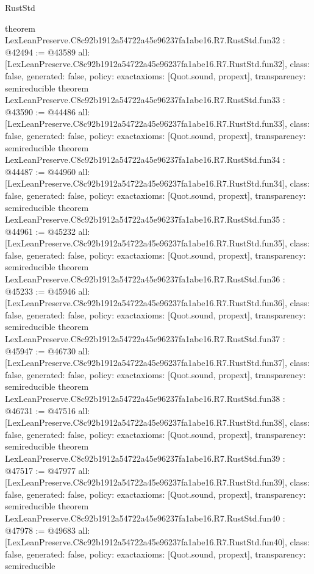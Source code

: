 \begin{lexlean}{RustStd}
\begin{coremodule}
{}
theorem LexLeanPreserve.C8c92b1912a54722a45e96237fa1abe16.R7.RustStd.fun32 : @42494 := @43589 {
  all: [LexLeanPreserve.C8c92b1912a54722a45e96237fa1abe16.R7.RustStd.fun32],
  class: false,
  generated: false,
  policy: exact{axioms: [Quot.sound, propext]},
  transparency: semireducible
}
theorem LexLeanPreserve.C8c92b1912a54722a45e96237fa1abe16.R7.RustStd.fun33 : @43590 := @44486 {
  all: [LexLeanPreserve.C8c92b1912a54722a45e96237fa1abe16.R7.RustStd.fun33],
  class: false,
  generated: false,
  policy: exact{axioms: [Quot.sound, propext]},
  transparency: semireducible
}
theorem LexLeanPreserve.C8c92b1912a54722a45e96237fa1abe16.R7.RustStd.fun34 : @44487 := @44960 {
  all: [LexLeanPreserve.C8c92b1912a54722a45e96237fa1abe16.R7.RustStd.fun34],
  class: false,
  generated: false,
  policy: exact{axioms: [Quot.sound, propext]},
  transparency: semireducible
}
theorem LexLeanPreserve.C8c92b1912a54722a45e96237fa1abe16.R7.RustStd.fun35 : @44961 := @45232 {
  all: [LexLeanPreserve.C8c92b1912a54722a45e96237fa1abe16.R7.RustStd.fun35],
  class: false,
  generated: false,
  policy: exact{axioms: [Quot.sound, propext]},
  transparency: semireducible
}
theorem LexLeanPreserve.C8c92b1912a54722a45e96237fa1abe16.R7.RustStd.fun36 : @45233 := @45946 {
  all: [LexLeanPreserve.C8c92b1912a54722a45e96237fa1abe16.R7.RustStd.fun36],
  class: false,
  generated: false,
  policy: exact{axioms: [Quot.sound, propext]},
  transparency: semireducible
}
theorem LexLeanPreserve.C8c92b1912a54722a45e96237fa1abe16.R7.RustStd.fun37 : @45947 := @46730 {
  all: [LexLeanPreserve.C8c92b1912a54722a45e96237fa1abe16.R7.RustStd.fun37],
  class: false,
  generated: false,
  policy: exact{axioms: [Quot.sound, propext]},
  transparency: semireducible
}
theorem LexLeanPreserve.C8c92b1912a54722a45e96237fa1abe16.R7.RustStd.fun38 : @46731 := @47516 {
  all: [LexLeanPreserve.C8c92b1912a54722a45e96237fa1abe16.R7.RustStd.fun38],
  class: false,
  generated: false,
  policy: exact{axioms: [Quot.sound, propext]},
  transparency: semireducible
}
theorem LexLeanPreserve.C8c92b1912a54722a45e96237fa1abe16.R7.RustStd.fun39 : @47517 := @47977 {
  all: [LexLeanPreserve.C8c92b1912a54722a45e96237fa1abe16.R7.RustStd.fun39],
  class: false,
  generated: false,
  policy: exact{axioms: [Quot.sound, propext]},
  transparency: semireducible
}
theorem LexLeanPreserve.C8c92b1912a54722a45e96237fa1abe16.R7.RustStd.fun40 : @47978 := @49683 {
  all: [LexLeanPreserve.C8c92b1912a54722a45e96237fa1abe16.R7.RustStd.fun40],
  class: false,
  generated: false,
  policy: exact{axioms: [Quot.sound, propext]},
  transparency: semireducible
}
\end{coremodule}
\end{lexlean}
